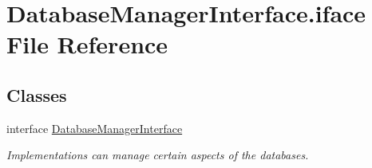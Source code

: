 \hypertarget{DatabaseManagerInterface_8iface}{\section{Database\-Manager\-Interface.\-iface File Reference}
\label{DatabaseManagerInterface_8iface}
}
\subsection*{Classes}
\begin{DoxyCompactItemize}
\item 
interface \hyperlink{interfaceDatabaseManagerInterface}{Database\-Manager\-Interface}
\begin{DoxyCompactList}\small\item\em Implementations can manage certain aspects of the databases. \end{DoxyCompactList}\end{DoxyCompactItemize}
